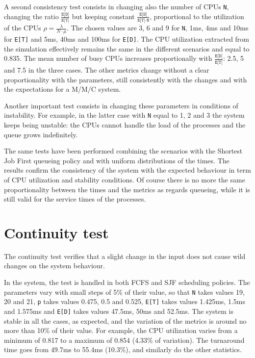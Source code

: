 A second consistency test consists in changing also the number of CPUs \texttt{N},
changing the ratio $\frac{\texttt{E[D]}}{\texttt{E[T]}}$ but keeping constant
$\frac{\texttt{E[D]}}{\texttt{E[T]}\cdot \texttt{N}}$, proportional to the
utilization of the CPUs $\rho=\frac{\lambda}{N\cdot \mu}$. The chosen values
are 3, 6 and 9 for \texttt{N}, 1ms, 4ms and 10ms for \texttt{E[T]} and 
5ms, 40ms and 100ms for \texttt{E[D]}. The CPU utilization extracted from
the simulation effectively remains the same in the different scenarios and equal
to 0.835. The mean number of busy CPUs increases proportionally with
$\frac{\texttt{E[D]}}{\texttt{E[T]}}$: 2.5, 5 and 7.5 in the three cases. The other 
metrics change without a clear proportionality with the parameters, still consistently 
with the changes and with the expectations for a M/M/C system.

Another important test consists in changing these parameters in conditions
of instability. For example, in the latter case with \texttt{N} equal to 1, 2 and 3
the system keeps being unstable: the CPUs cannot handle the load of
the processes and the queue grows indefinitely.

The same tests have been performed combining the scenarios with the Shortest 
Job First queueing policy and with uniform distributions of the times. The results
confirm the consistency of the system with the expected behaviour in term of
CPU utilization and stability conditions. Of course there is no more the same
proportionality between the times and the metrics as regards queueing, while it 
is still valid for the service times of the processes.

\section{Continuity test}
The continuity test verifies that a slight change in the input does not 
cause wild changes on the system behaviour.

In the system, the test is handled in both FCFS and SJF scheduling policies.
The parameters vary with small steps of 5\% of their value, so that 
\texttt{N} takes values 19, 20 and 21, \texttt{p} takes values 0.475, 0.5 and 0.525,
\texttt{E[T]} takes values 1.425ms, 1.5ms and 1.575ms and \texttt{E[D]} takes values
47.5ms, 50ms and 52.5ms. The system is stable in all the cases, as expected,
and the variation of the metrics is around no more than 10\% of their value. For
example, the CPU utilization varies from a minimum of 0.817 to a maximum of 0.854 (4.33\% of variation).
The turnaround time goes from 49.7ms to 55.4ms (10.3\%), and similarly do the other
statistics.